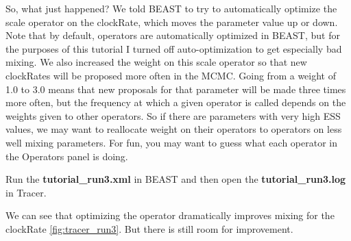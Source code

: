 \documentclass[11pt]{article}
\begin{document}
So, what just happened? We told BEAST to try to automatically optimize the scale operator on the clockRate, which moves the parameter value up or down. Note that by default, operators are automatically optimized in BEAST, but for the purposes of this tutorial I turned off auto-optimization to get especially bad mixing. We also increased the weight on this scale operator so that new clockRates will be proposed more often in the MCMC. Going from a weight of 1.0 to 3.0 means that new proposals for that parameter will be made three times more often, but the frequency at which a given operator is called depends on the weights given to other operators. So if there are parameters with very high ESS values, we may want to reallocate weight on their operators to operators on less well mixing parameters. For fun, you may want to guess what each operator in the Operators panel is doing.


\begin{framed}
Run the \textbf{tutorial\_run3.xml} in BEAST and then open the \textbf{tutorial\_run3.log} in Tracer.
\end{framed}

We can see that optimizing the operator dramatically improves mixing for the clockRate \ref{fig:tracer_run3}. But there is still room for improvement.
\end{document}
